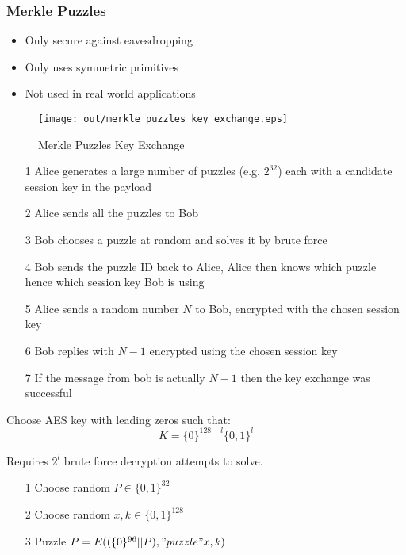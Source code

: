 \documentclass[a4paper]{article}
\begin{document}
\subsubsection{Merkle Puzzles}

\begin{itemize}
  \item Only secure against eavesdropping
  \item Only uses symmetric primitives
  \item Not used in real world applications
\end{itemize}

\begin{figure}[h!]
  \centering
  \texttt{[image: out/merkle\_puzzles\_key\_exchange.eps]}
  \caption{Merkle Puzzles Key Exchange}
  \label{fig:merkle_puzzles_key_exchange}
\end{figure}
\FloatBarrier


\begin{enumerate}
  \item[1] Alice generates a large number of puzzles (e.g. $2^{32}$) each with a
           candidate session key in the payload
  \item[2] Alice sends all the puzzles to Bob
  \item[3] Bob chooses a puzzle at random and solves it by brute force
  \item[4] Bob sends the puzzle ID back to Alice, Alice then knows which puzzle
           hence which session key Bob is using
  \item[5] Alice sends a random number $N$ to Bob, encrypted with the
           chosen session key
  \item[6] Bob replies with $N-1$ encrypted using the chosen session key
  \item[7] If the message from bob is actually $N-1$ then the key exchange was
           successful
\end{enumerate}

Choose AES key with leading zeros such that:
\[K = \{0\}^{128-l} \{0,1\}^{l}\]

Requires $2^{l}$ brute force decryption attempts to solve.


\begin{enumerate}
  \item[1] Choose random $P \in \{0,1\}^{32}$
  \item[2] Choose random $x, k \in \{0,1\}^{128}$
  \item[3] Puzzle $P = E((\{0\}^{96}||P), "puzzle" x, k)$
\end{enumerate}
\end{document}
